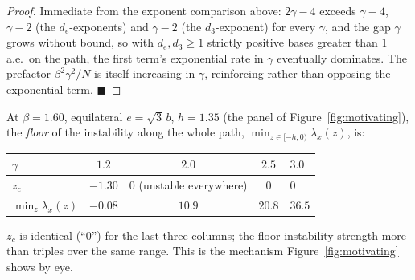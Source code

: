 \documentclass[11pt,a4paper]{article}
\theoremstyle{plain}
\theoremstyle{definition}
\theoremstyle{remark}
\newcommand{\lam}{\lambda}
\newcommand{\bw}{\beta}
\newcommand{\de}{d_e}
\newcommand{\dth}{d_3}
\begin{document}
\begin{proof}
Immediate from the exponent comparison above: $2\gamma-4$ exceeds $\gamma-4$,
$\gamma-2$ (the $\de$-exponents) and $\gamma-2$ (the $\dth$-exponent) for
every $\gamma$, and the gap $\gamma$ grows without bound, so with
$\de,\dth\ge1$ strictly positive bases greater than $1$ a.e.\ on the path,
the first term's exponential rate in $\gamma$ eventually dominates. The
prefactor $\bw^2\gamma^2/N$ is itself increasing in $\gamma$, reinforcing
rather than opposing the exponential term. $\blacksquare$
\end{proof}

\begin{keybox}
At $\bw=1.60$, equilateral $e=\sqrt3\,b$, $h=1.35$ (the panel of
Figure~\ref{fig:motivating}), the \emph{floor} of the instability along the
whole path, $\min_{z\in[-h,0)}\lam_x(z)$, is:
\begin{center}
\begin{tabular}{@{}lccc@{}}
\toprule
$\gamma$ & $1.2$ & $2.0$ & $2.5$ & $3.0$\\
\midrule
$z_c$ & $-1.30$ & $0$ (unstable everywhere) & $0$ & $0$\\
$\min_z\lam_x(z)$ & $-0.08$ & $10.9$ & $20.8$ & $36.5$\\
\bottomrule
\end{tabular}
\end{center}
$z_c$ is identical (``$0$'') for the last three columns; the floor
instability strength more than triples over the same range. This is the
mechanism Figure~\ref{fig:motivating} shows by eye.
\end{keybox}
\end{document}

